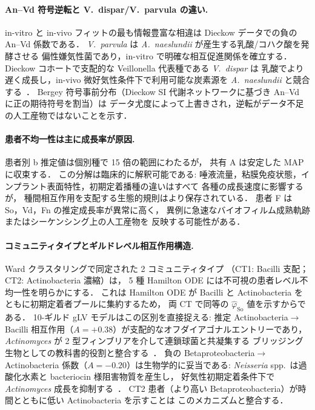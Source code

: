 \documentclass[11pt,a4paper]{article}
\begin{document}
\paragraph{An--Vd 符号逆転と V.~dispar/V.~parvula の違い.}
in-vitro と in-vivo フィットの最も情報豊富な相違は
Dieckow データでの負の An--Vd 係数である．
\textit{V.~parvula} は \textit{A.~naeslundii} が産生する乳酸/コハク酸を発酵させる
偏性嫌気性菌であり，in-vitro で明確な相互促進関係を確立する．
Dieckow コホートで支配的な Veillonella 代表種である \textit{V.~dispar} は
乳酸でより遅く成長し，in-vivo 微好気性条件下で利用可能な炭素源を
\textit{A.~naeslundii} と競合する~\cite{Rogosa1965Veillonella}．
Bergey 符号事前分布（Dieckow SI 代謝ネットワークに基づき An--Vd に正の期待符号を割当）は
データ尤度によって上書きされ，逆転がデータ不足の人工産物ではないことを示す．

\paragraph{患者不均一性は主に成長率が原因.}
患者別 b 推定値は個別種で 15 倍の範囲にわたるが，
共有 A は安定した MAP に収束する．
この分解は臨床的に解釈可能である:
唾液流量，粘膜免疫状態，インプラント表面特性，初期定着播種の違いはすべて
各種の成長速度に影響するが，
種間相互作用を支配する生態的規則はより保存されている．
患者 F は So，Vd，Fn の推定成長率が異常に高く，
異例に急速なバイオフィルム成熟軌跡またはシーケンシング上の人工産物を
反映する可能性がある．

\paragraph{コミュニティタイプとギルドレベル相互作用構造.}
Ward クラスタリングで同定された 2 コミュニティタイプ
（CT1: Bacilli 支配；CT2: Actinobacteria 濃縮）は，
5 種 Hamilton ODE には不可視の患者レベル不均一性を明らかにする．
これは Hamilton ODE が Bacilli と Actinobacteria をともに初期定着者プールに集約するため，
両 CT で同等の $\hat{\varphi}_\mathrm{So}$ 値を示すからである．
10-ギルド gLV モデルはこの区別を直接捉える:
推定 Actinobacteria$\to$Bacilli 相互作用（$A=+0.38$）が支配的なオフダイアゴナルエントリーであり，
\textit{Actinomyces} が 2 型フィンブリアを介して連鎖球菌と共凝集する
ブリッジング生物としての教科書的役割と整合する~\cite{Kolenbrander2010OralMultispecies}．
負の Betaproteobacteria$\to$Actinobacteria 係数（$A=-0.20$）は生物学的に妥当である:
\textit{Neisseria} spp.\ は過酸化水素と bacteriocin 様阻害物質を産生し，
好気性初期定着条件下で \textit{Actinomyces} 成長を抑制する~\cite{Kolenbrander2010OralMultispecies}．
CT2 患者（より高い Betaproteobacteria）が時間とともに低い Actinobacteria を示すことは
このメカニズムと整合する．
\end{document}
